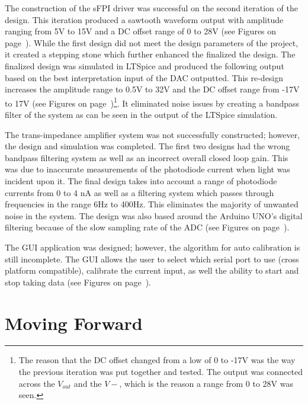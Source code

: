 \documentclass[12pt,journal]{IEEEtran}
\begin{document}
The construction of the sFPI driver was successful on the second iteration of the design. This iteration produced a sawtooth waveform output with amplitude ranging from 5V to 15V and a DC offset range of 0 to 28V (see Figures on page~\pageref{ss:output-signal-graphs}). While the first design did not meet the design parameters of the project, it created a stepping stone which further enhanced the finalized the design. The finalized design was simulated in LTSpice and produced the following output based on the best interpretation input of the DAC outputted. This re-design increases the amplitude range to 0.5V to 32V and the DC offset range from -17V to 17V (see Figures on page~\pageref{subss:final-design-output})\footnote{The reason that the DC offset changed from a low of 0 to -17V was the way the previous iteration was put together and tested. The output was connected across the $V_{out}$ and the $V-$, which is the reason a range from 0 to 28V was seen.}. It eliminated noise issues by creating a bandpass filter of the system as can be seen in the output of the LTSpice simulation.  

The trans-impedance amplifier system was not successfully constructed; however, the design and simulation was completed. The first two designs had the wrong bandpass filtering system as well as an incorrect overall closed loop gain. This was due to inaccurate measurements of the photodiode current when light was incident upon it. The final design takes into account a range of photodiode currents from 0 to 4 nA as well as a filtering system which passes through frequencies in the range 6Hz to 400Hz. This eliminates the majority of unwanted noise in the system. The design was also based around the Arduino UNO's digital filtering because of the slow sampling rate of the ADC (see Figures on page~\pageref{subss:trans-amp-output}).

The GUI application was designed; however, the algorithm for auto calibration is still incomplete. The GUI allows the user to select which serial port to use (cross platform compatible), calibrate the current input, as well the ability to start and stop taking data (see Figures on page~\pageref{subss:GUI}).   


\section{Moving Forward}
\end{document}
